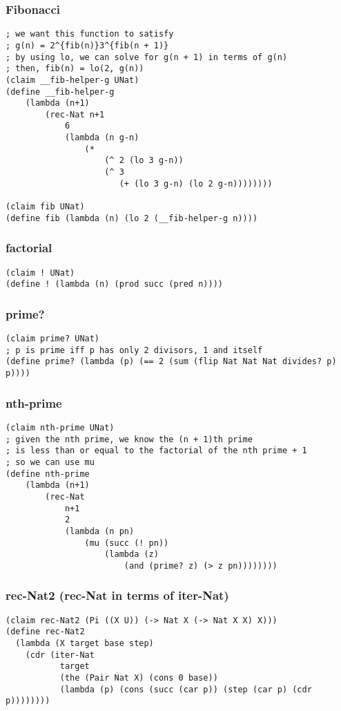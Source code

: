 \subsubsection{Fibonacci} \label{code:Fibonacci}
\begin{verbatim}
; we want this function to satisfy
; g(n) = 2^{fib(n)}3^{fib(n + 1)}
; by using lo, we can solve for g(n + 1) in terms of g(n)
; then, fib(n) = lo(2, g(n))
(claim __fib-helper-g UNat)
(define __fib-helper-g
    (lambda (n+1)
        (rec-Nat n+1
            6
            (lambda (n g-n) 
                (*
                    (^ 2 (lo 3 g-n))
                    (^ 3
                       (+ (lo 3 g-n) (lo 2 g-n))))))))

(claim fib UNat)
(define fib (lambda (n) (lo 2 (__fib-helper-g n))))
\end{verbatim}

\subsubsection{factorial} \label{code:factorial}
\begin{verbatim}
(claim ! UNat)
(define ! (lambda (n) (prod succ (pred n))))
\end{verbatim}

\subsubsection{prime?} \label{code:prime?}
\begin{verbatim}
(claim prime? UNat)
; p is prime iff p has only 2 divisors, 1 and itself
(define prime? (lambda (p) (== 2 (sum (flip Nat Nat Nat divides? p) p))))
\end{verbatim}

\subsubsection{nth-prime} \label{code:nth-prime}
\begin{verbatim}
(claim nth-prime UNat)
; given the nth prime, we know the (n + 1)th prime
; is less than or equal to the factorial of the nth prime + 1
; so we can use mu
(define nth-prime
    (lambda (n+1)
        (rec-Nat
            n+1
            2
            (lambda (n pn) 
                (mu (succ (! pn)) 
                    (lambda (z) 
                        (and (prime? z) (> z pn))))))))
\end{verbatim}

\subsubsection{rec-Nat2 (rec-Nat in terms of iter-Nat)} \label{code:rec-Nat2}
\begin{verbatim}
(claim rec-Nat2 (Pi ((X U)) (-> Nat X (-> Nat X X) X)))
(define rec-Nat2
  (lambda (X target base step)
    (cdr (iter-Nat
           target
           (the (Pair Nat X) (cons 0 base))
           (lambda (p) (cons (succ (car p)) (step (car p) (cdr p))))))))
\end{verbatim}

